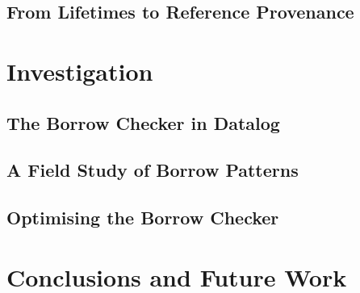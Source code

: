 \documentclass{UUThesisTemplate}
\newcommand{\fixme}[1] {{\color{red}#1}}
\begin{document}
\section{From Lifetimes to Reference Provenance}

\chapter{Investigation}


\section{The Borrow Checker in Datalog}

\section{A Field Study of Borrow Patterns}

\section{Optimising the Borrow Checker}

\chapter{Conclusions and Future Work}


\printbibliography[heading=bibintoc]
\end{document}
